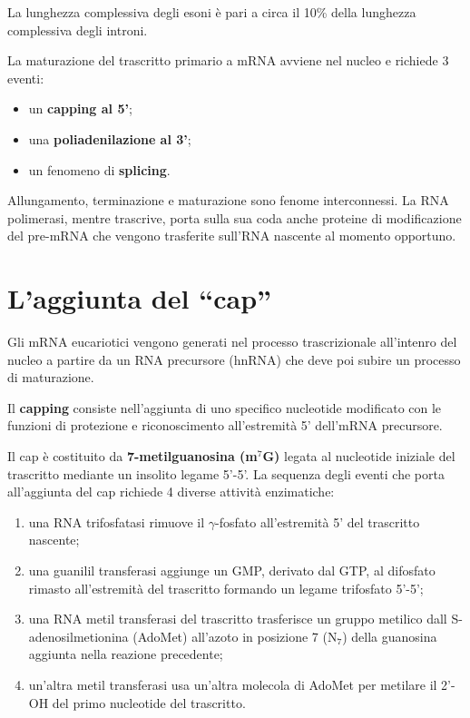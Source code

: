 \documentclass[11pt]{book}
\begin{document}
La lunghezza complessiva degli esoni è pari a circa il 10\% della
lunghezza complessiva degli introni.

La maturazione del trascritto primario a mRNA avviene nel nucleo e
richiede 3 eventi:

\begin{itemize}
\itemsep1pt\parskip0pt
\item
  un \textbf{capping al 5'};
\item
  una \textbf{poliadenilazione al 3'};
\item
  un fenomeno di \textbf{splicing}.
\end{itemize}

Allungamento, terminazione e maturazione sono fenome interconnessi. La
RNA polimerasi, mentre trascrive, porta sulla sua coda anche proteine di
modificazione del pre-mRNA che vengono trasferite sull'RNA nascente al
momento opportuno.

\section{\texorpdfstring{L'aggiunta del
``cap''}{L'aggiunta del cap}}\label{laggiunta-del-cap}

Gli mRNA eucariotici vengono generati nel processo trascrizionale
all'intenro del nucleo a partire da un RNA precursore (hnRNA) che deve
poi subire un processo di maturazione.

Il \textbf{capping} consiste nell'aggiunta di uno specifico nucleotide
modificato con le funzioni di protezione e riconoscimento all'estremità
5' dell'mRNA precursore.

Il cap è costituito da \textbf{7-metilguanosina (m\(^7\)G)} legata al
nucleotide iniziale del trascritto mediante un insolito legame 5'-5'. La
sequenza degli eventi che porta all'aggiunta del cap richiede 4 diverse
attività enzimatiche:

\begin{enumerate}
\def\labelenumi{\arabic{enumi}.}
\itemsep1pt\parskip0pt
\item
  una RNA trifosfatasi rimuove il \(\gamma\)-fosfato all'estremità 5'
  del trascritto nascente;
\item
  una guanilil transferasi aggiunge un GMP, derivato dal GTP, al
  difosfato rimasto all'estremità del trascritto formando un legame
  trifosfato 5'-5';
\item
  una RNA metil transferasi del trascritto trasferisce un gruppo
  metilico dall S-adenosilmetionina (AdoMet) all'azoto in posizione 7
  (N\(_7\)) della guanosina aggiunta nella reazione precedente;
\item
  un'altra metil transferasi usa un'altra molecola di AdoMet per
  metilare il 2'-OH del primo nucleotide del trascritto.
\end{enumerate}
\end{document}
